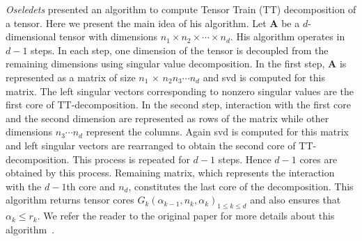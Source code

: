 \documentclass[runningheads]{llncs}
\newcommand{\tensor}[1]{\cal\textbf{#1}\xspace}
\begin{document}
\noindent \textit{Oseledets} presented an algorithm to compute Tensor Train (TT) decomposition of a tensor. Here we present the main idea of his algorithm. Let \tensor{A} be a $d$-dimensional tensor with dimensions $n_1 \times n_2 \times \cdots \times n_d$. His algorithm operates in $d-1$ steps. In each step, one dimension of the tensor is decoupled from the remaining dimensions using singular value decomposition. In the first step, \tensor{A} is represented as a matrix of size $n_1$ $\times$ $n_2 n_3 \cdots n_d$ and svd is computed for this matrix. The left singular vectors corresponding to nonzero singular values are the first core of TT-decomposition. In the second step, interaction with the first core and the second dimension are represented as rows of the matrix while other dimensions $n_3\cdots n_d$ represent the columns. Again svd is computed for this matrix and  left singular vectors are rearranged to obtain the second  core of TT-decomposition. This process is repeated for $d-1$ steps. Hence $d-1$ cores are obtained by this process. Remaining matrix, which represents the interaction with the $d-1$th core and $n_d$, constitutes the last core of the decomposition. This algorithm returns tensor cores $G_k(\alpha_{k-1}, n_k, \alpha_k) _{1\le k\le d}$ and also ensures that $\alpha_k \le r_k$. We refer the reader to the original paper for more details about this algorithm~\cite{tt}. 

\end{document}
